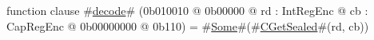 function clause #\hyperref[zdecode]{decode}# (0b010010 @ 0b00000 @ rd : IntRegEnc @ cb : CapRegEnc @ 0b00000000 @ 0b110) = #\hyperref[zSome]{Some}#(#\hyperref[zCGetSealed]{CGetSealed}#(rd, cb))
